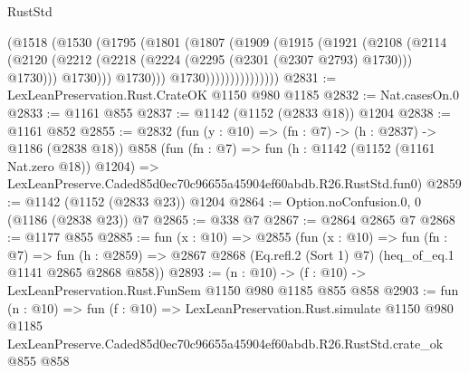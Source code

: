 \begin{lexlean}{RustStd}
\begin{coremodule}
                          (@1518
                            (@1530
                              (@1795
                                (@1801
                                  (@1807
                                    (@1909
                                      (@1915
                                        (@1921
                                          (@2108
                                            (@2114
                                              (@2120
                                                (@2212
                                                  (@2218
                                                    (@2224 (@2295 (@2301 (@2307 @2793) @1730)))
                                                    @1730)))
                                              @1730)))
                                        @1730)))
                                  @1730)))))))))))))))
@2831 := LexLeanPreservation.Rust.CrateOK @1150 @980 @1185
@2832 := Nat.casesOn.{0}
@2833 := @1161 @855
@2837 := @1142 (@1152 (@2833 @18)) @1204
@2838 := @1161 @852
@2855 := @2832
    (fun (y : @10) => (fn : @7) -> (h : @2837) -> @1186 (@2838 @18))
    @858
    (fun (fn : @7) =>
    fun (h : @1142 (@1152 (@1161 Nat.zero @18)) @1204) =>
    LexLeanPreserve.Caded85d0ec70c96655a45904ef60abdb.R26.RustStd.fun0)
@2859 := @1142 (@1152 (@2833 @23)) @1204
@2864 := Option.noConfusion.{0, 0} (@1186 (@2838 @23)) @7
@2865 := @338 @7
@2867 := @2864 @2865 @7
@2868 := @1177 @855
@2885 := fun (x : @10) =>
  @2855
    (fun (x : @10) =>
    fun (fn : @7) =>
    fun (h : @2859) => @2867 @2868 (Eq.refl.{2} (Sort 1) @7) (heq_of_eq.{1} @1141 @2865 @2868 @858))
@2893 := (n : @10) -> (f : @10) -> LexLeanPreservation.Rust.FunSem @1150 @980 @1185 @855 @858
@2903 := fun (n : @10) =>
  fun (f : @10) =>
  LexLeanPreservation.Rust.simulate
    @1150
    @980
    @1185
    LexLeanPreserve.Caded85d0ec70c96655a45904ef60abdb.R26.RustStd.crate_ok
    @855
    @858
\end{coremodule}
\end{lexlean}
